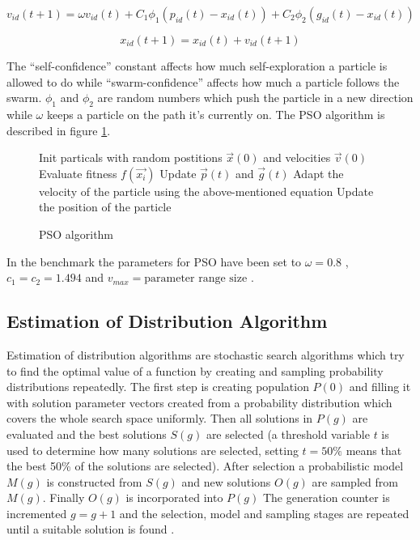 \begin{equation}
  v_{id} (t+1) = \omega v_{id} (t) + C_1 \phi_1 (p_{id} (t) - x_{id} (t)) + C_2 \phi_2 (g_{id} (t) - x_{id} (t))
\end{equation}

\begin{equation}
  x_{id} (t+1) = x_{id} (t) + v_{id} (t+1)
\end{equation}

The “self-confidence” constant affects how much self-exploration a particle is allowed to do while “swarm-confidence” affects how much a particle follows the swarm. $\phi_1$ and $\phi_2$ are random numbers which push the particle in a new direction while $\omega$ keeps a particle on the path it’s currently on. The PSO algorithm is described in figure \ref{algo:pso}.

\begin{figure}[h]
  \centering
  \begin{minipage}{12.5cm}
    \begin{algorithmic}
      \State Init particals with random postitions
      $\vec{x}(0)$ and velocities $\vec{v}(0)$
      \Repeat
          \State Evaluate fitness $f(\vec{x_i})$
          \State Update $\vec{p}(t)$ and $\vec{g}(t)$
          \State Adapt the velocity of the particle using the above-mentioned equation
          \State Update the position of the particle
        \EndFor
    \end{algorithmic}
  \end{minipage}
  \caption{PSO algorithm}
  \label{algo:pso}
\end{figure}

In the benchmark the parameters for PSO have been set to $\omega = 0.8$ \cite{shi1998modified}, $c_1 = c_2 = 1.494$ \cite{kennedy1999small} and $v_{max} = \text{parameter range size}$ \cite{Das2008}.

\subsection{Estimation of Distribution Algorithm}

Estimation of distribution algorithms are stochastic search algorithms which try to find the optimal value of a function by creating and sampling probability distributions repeatedly. The first step is creating population $P(0)$ and filling it with solution parameter vectors created from a probability distribution which covers the whole search space uniformly. Then all solutions in $P(g)$ are evaluated and the best solutions $S(g)$ are selected (a threshold variable $t$ is used to determine how many solutions are selected, setting $t=50\%$ means that the best 50\% of the solutions are selected). After selection a probabilistic model $M(g)$ is constructed from $S(g)$ and new solutions $O(g)$ are sampled from $M(g)$. Finally $O(g)$ is incorporated into $P(g)$ The generation counter is incremented $g = g + 1$ and the selection, model and sampling stages are repeated until a suitable solution is found \cite{Hauschild2011111}.


